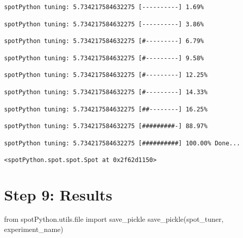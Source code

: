 \documentclass[
  letterpaper,
  DIV=11,
  numbers=noendperiod]{scrreprt}
\newenvironment{Shaded}{\begin{snugshade}}{\end{snugshade}}
\newcommand{\BuiltInTok}[1]{\textcolor[rgb]{0.00,0.23,0.31}{#1}}
\newcommand{\ImportTok}[1]{\textcolor[rgb]{0.00,0.46,0.62}{#1}}
\newcommand{\NormalTok}[1]{\textcolor[rgb]{0.00,0.23,0.31}{#1}}
\begin{document}
\begin{verbatim}
spotPython tuning: 5.734217584632275 [----------] 1.69% 
\end{verbatim}

\begin{verbatim}
spotPython tuning: 5.734217584632275 [----------] 3.86% 
\end{verbatim}

\begin{verbatim}
spotPython tuning: 5.734217584632275 [#---------] 6.79% 
\end{verbatim}

\begin{verbatim}
spotPython tuning: 5.734217584632275 [#---------] 9.58% 
\end{verbatim}

\begin{verbatim}
spotPython tuning: 5.734217584632275 [#---------] 12.25% 
\end{verbatim}

\begin{verbatim}
spotPython tuning: 5.734217584632275 [#---------] 14.33% 
\end{verbatim}

\begin{verbatim}
spotPython tuning: 5.734217584632275 [##--------] 16.25% 
\end{verbatim}

\begin{verbatim}
spotPython tuning: 5.734217584632275 [#########-] 88.97% 
\end{verbatim}

\begin{verbatim}
spotPython tuning: 5.734217584632275 [##########] 100.00% Done...
\end{verbatim}

\begin{verbatim}
<spotPython.spot.spot.Spot at 0x2f62d1150>
\end{verbatim}

\hypertarget{sec-results-tuning-10}{%
\section{Step 9: Results}\label{sec-results-tuning-10}}

\begin{Shaded}
\begin{Highlighting}[]
\ImportTok{from}\NormalTok{ spotPython.utils.}\BuiltInTok{file} \ImportTok{import}\NormalTok{ save\_pickle}
\NormalTok{save\_pickle(spot\_tuner, experiment\_name)}
\end{Highlighting}
\end{Shaded}
\end{document}
